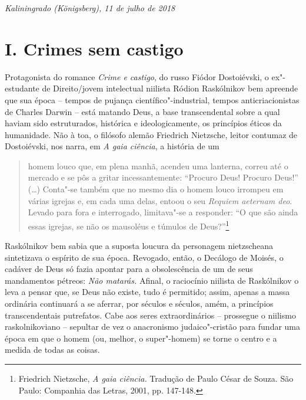 
\begin{flushright}
\emph{Kaliningrado (Königsberg), 11 de julho de 2018}
\end{flushright}

\section{I. Crimes sem castigo}

Protagonista do romance \emph{Crime e castigo}, do russo Fiódor
Dostoiévski, o ex"-estudante de Direito/jovem intelectual niilista Ródion
Raskólnikov bem apreende que sua época -- tempos de pujança
científico"-industrial, tempos anticriacionistas de Charles Darwin --
está matando Deus, a base transcendental sobre a qual haviam sido
estruturados, histórica e ideologicamente, os princípios éticos da
humanidade. Não à toa, o filósofo alemão Friedrich Nietzsche, leitor
contumaz de Dostoiévski, nos narra, em \emph{A gaia ciência}, a história
de um

\begin{quote}
homem louco que, em plena manhã, acendeu uma lanterna, correu até o
mercado e se pôs a gritar incessantemente: ``Procuro Deus! Procuro
Deus!'' (\ldots{}) Conta"-se também que no mesmo dia o homem louco irrompeu em
várias igrejas e, em cada uma delas, entoou o seu \emph{Requiem aeternam
deo}. Levado para fora e interrogado, limitava"-se a responder: ``O que
são ainda essas igrejas, se não os mausoléus e túmulos de
Deus?''\footnote{Friedrich Nietzsche, \emph{A gaia ciência.} Tradução de
  Paulo César de Souza. São Paulo: Companhia das Letras, 2001, pp.
  147-148.}
\end{quote}

Raskólnikov bem sabia que a suposta loucura da personagem nietzscheana
sintetizava o espírito de sua época. Revogado, então, o Decálogo de
Moisés, o cadáver de Deus só fazia apontar para a obsolescência de um de
seus mandamentos pétreos: \emph{Não matarás.} Afinal, o raciocínio
niilista de Raskólnikov o leva a pensar que, se Deus não existe, tudo é
permitido; assim, apenas a massa ordinária continuará a se aferrar, por
séculos e séculos, amém, a princípios transcendentais putrefatos. Cabe
aos seres extraordinários -- prossegue o niilismo raskolnikoviano --
sepultar de vez o anacronismo judaico"-cristão para fundar uma época em
que o homem (ou, melhor, o super"-homem) se torne o centro e a medida de
todas as coisas.

